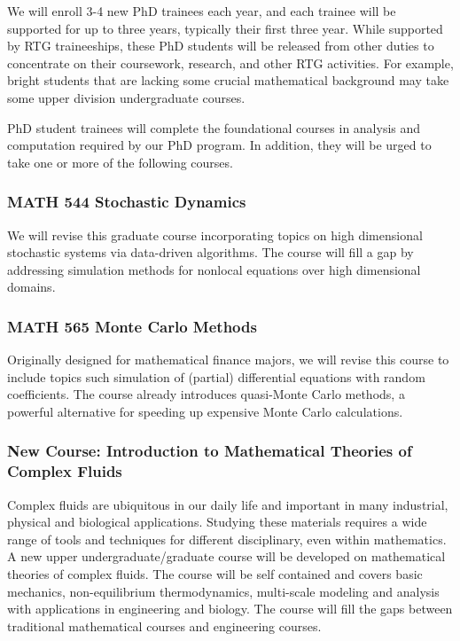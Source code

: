 \documentclass[11pt]{NSFamsart}
\begin{document}

We will enroll 3-4 new PhD trainees each year, and each trainee will be supported for up to three years, typically their first three year.  While supported by RTG traineeships, these PhD students will be released from other duties to concentrate on their coursework, research, and other RTG activities.  For example, bright students that are lacking some crucial mathematical background may take some upper division undergraduate courses.  

PhD student trainees will complete the foundational courses in analysis and computation required by our PhD program.  In addition, they will be urged to take one or more of the following courses.

\subsubsection*{MATH 544 Stochastic Dynamics}
We will revise this graduate course  incorporating topics on  high dimensional stochastic systems via data-driven algorithms.  The course will fill a gap by addressing simulation methods for nonlocal equations over high dimensional domains.

\subsubsection*{MATH 565 Monte Carlo Methods} Originally designed for mathematical finance majors, we will revise this course to include topics such simulation of (partial) differential equations with random coefficients.  The course already introduces quasi-Monte Carlo methods, a powerful alternative for speeding up expensive Monte Carlo calculations.

\subsubsection*{New Course: Introduction to Mathematical Theories of Complex Fluids} 
Complex fluids are ubiquitous in our daily life and important in many industrial, physical and biological applications. Studying these materials requires a wide range 
of tools and techniques for different disciplinary, even within mathematics. A new upper undergraduate/graduate course will be developed on mathematical theories of complex fluids. The course will be self contained and covers basic mechanics, non-equilibrium thermodynamics, multi-scale modeling and analysis with applications in engineering and biology. The course will fill the gaps between traditional mathematical courses and engineering courses.
 
\end{document}
